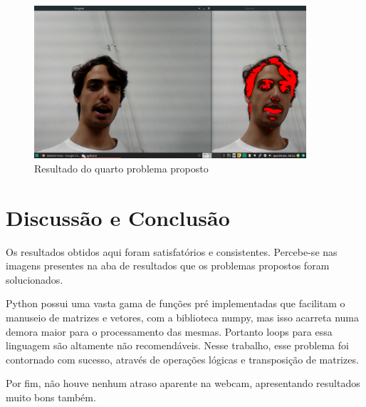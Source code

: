 \documentclass{bmvc2k}
\begin{document}
\begin{figure}[!h]
    \centering
    \includegraphics[width=0.9\textwidth]{Figs/trab4.png}
    \caption{Resultado do quarto problema proposto}
    \label{fig:trab4}
\end{figure}
 \FloatBarrier


\section{Discussão e Conclusão}
    Os resultados obtidos aqui foram satisfatórios e consistentes. Percebe-se nas imagens presentes na aba de resultados que os problemas propostos foram solucionados. 
    
    Python possui uma vasta gama de funções pré implementadas que facilitam o manuseio de matrizes e vetores, com a biblioteca numpy, mas isso acarreta numa demora maior para o processamento das mesmas. Portanto loops para essa linguagem são altamente não recomendáveis. Nesse trabalho, esse problema foi contornado com sucesso, através de operações lógicas e transposição de matrizes.
    
    Por fim, não houve nenhum atraso aparente na webcam, apresentando resultados muito bons também.


\end{document}
